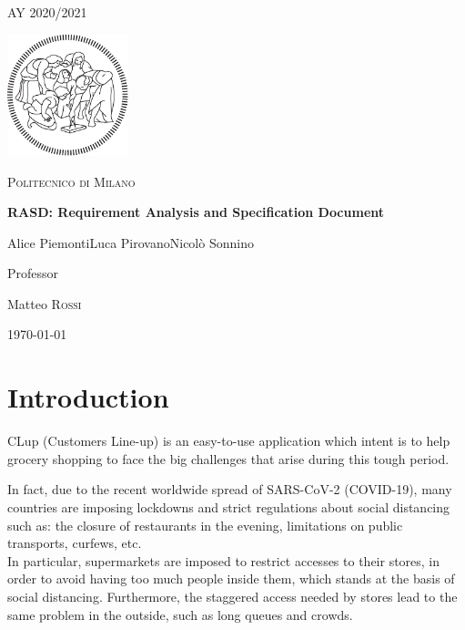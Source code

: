 \documentclass[table, 12pt]{article}
\begin{document}
\begin{titlepage}
    \centering
    {\scshape\large AY 2020/2021 \par}
    \vfill
    \includegraphics[width=100pt]{assets/logo-polimi-new}\par\vspace{1cm}
    {\scshape\LARGE Politecnico di Milano \par}
    \vspace{1.5cm}
    {\huge\bfseries RASD\@: Requirement Analysis
        and Specification Document \par}
    \vspace{2cm}
    {\Large {Alice Piemonti\quad Luca Pirovano\quad Nicolò Sonnino}\par}
    \vfill
    {\large Professor\par
        Matteo \textsc{Rossi}}
    \vfill
    {\large \today \par}
\end{titlepage}
\thispagestyle{plain}
\mbox{}
\newpage
{}
\tableofcontents
\newpage
{}
\section{Introduction}
CLup (Customers Line-up) is an easy-to-use application which intent is to help grocery shopping to face the big challenges that arise during this tough period.

In fact, due to the recent worldwide spread of SARS-CoV-2 (COVID-19), many countries are imposing lockdowns and strict regulations about social distancing such as: the closure of restaurants in the evening, limitations on public transports, curfews, etc.\\

In particular, supermarkets are imposed to restrict accesses to their stores, in order to avoid having too much people inside them, which stands at the basis of social distancing. Furthermore, the staggered access needed by stores lead to the same problem in the outside, such as long queues and crowds.
\end{document}

